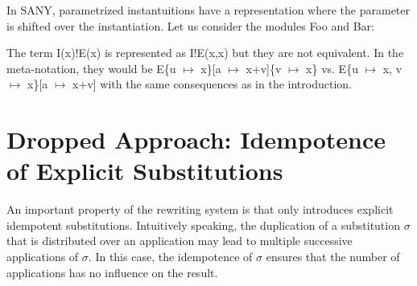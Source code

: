 \documentclass[a4paper]{article}
\newcommand{\tla}[1]{#1}
\begin{document}
In SANY, parametrized instantuitions have a representation where the
parameter is shifted over the instantiation. Let us consider the
modules Foo and Bar:

\begin{parcolumns}{2}
\end{parcolumns}

The term \tla{I(x)!E(x)} is represented as \tla{I!E(x,x)} but they are
not equivalent. In the meta-notation, they would be
E\{u $\mapsto$ x\}[a $\mapsto$ x+v]\{v $\mapsto$ x\} vs. E\{u $\mapsto$ x,
v $\mapsto$ x\}[a $\mapsto$ x+v] with the same consequences as in the
introduction.

\vspace{2cm}

\newpage
\appendix
\section{Dropped Approach: Idempotence of Explicit Substitutions}
\label{sec:idempotence}
An important property of the rewriting system is that only introduces
explicit idempotent substitutions. Intuitively speaking, the duplication of
a substitution $\sigma$ that is distributed over an application may lead to
multiple successive applications of $\sigma$. In this case, the idempotence
of $\sigma$ ensures that the number of applications has no influence on
the result.
\end{document}
